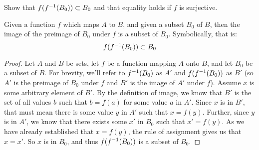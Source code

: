 \documentclass[main.tex]{subfiles}
\begin{document}
\subproblem{}\label{s2p1b}

Show that \(f({f}^{-1}(B_0)) \subset B_0\) and that equality holds if \(f\)
is surjective.

\begin{thm}
	Given a function \(f\) which maps \(A\) to \(B\), and given a subset
	\(B_0\) of \(B\), then the image of the preimage of \(B_0\) under \(f\)
	is a subset of \(B_0\). Symbolically, that is:
	\[f({f}^{-1}(B_0)) \subset B_0\]
\end{thm}
\begin{proof}
	Let \(A\) and \(B\) be sets, let \(f\) be a function mapping \(A\) onto
	\(B\), and let \(B_0\) be a subset of \(B\). For brevity, we'll refer to
	\({f}^{-1}(B_0)\) as \(A'\) and \(f({f}^{-1}(B_0))\) as \(B'\) (so
	\(A'\) is the preimage of \(B_0\) under \(f\) and \(B'\) is the image of
	\(A'\) under \(f\)). Assume \(x\) is some arbitrary element of \(B'\).
	By the definition of image, we know that \(B'\) is the set of all values
	\(b\) such that \(b = f(a)\) for some value \(a\) in \(A'\). Since \(x\)
	is in \(B'\), that must mean there is some value \(y\) in \(A'\) such
	that \(x = f(y)\). Further, since \(y\) is in \(A'\), we know that there
	exists some \(x'\) in \(B_0\) such that \(x' = f(y)\). As we have
	already established that \(x = f(y)\), the rule of assignment gives us
	that \(x = x'\). So \(x\) is in \(B_0\), and thus
	\(f({f}^{-1}(B_0))\) is a subset of \(B_0\).
\end{proof}
\end{document}
